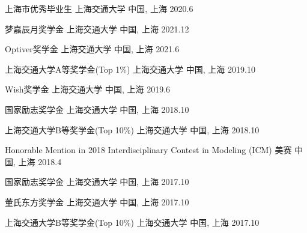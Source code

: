 


\begin{cvhonors}


\cvhonor
{上海市优秀毕业生} %
{上海交通大学} %
{中国, 上海} %
{2020.6} %


\cvhonor
{梦嘉辰月奖学金} %
{上海交通大学} %
{中国, 上海} %
{2021.12} %


\cvhonor
{Optiver奖学金} %
{上海交通大学} %
{中国, 上海} %
{2021.6} %


\cvhonor
{上海交通大学A等奖学金(Top 1\%)} %
{上海交通大学} %
{中国, 上海} %
{2019.10} %


\cvhonor
{Wish奖学金} %
{上海交通大学} %
{中国, 上海} %
{2019.6} %


\cvhonor
{国家励志奖学金} %
{上海交通大学} %
{中国, 上海} %
{2018.10} %


\cvhonor
{上海交通大学B等奖学金(Top 10\%)} %
{上海交通大学} %
{中国, 上海} %
{2018.10} %


\cvhonor
{Honorable Mention in 2018 Interdisciplinary Contest in Modeling (ICM)} %
{美赛} %
{中国, 上海} %
{2018.4} %


\cvhonor
{国家励志奖学金} %
{上海交通大学} %
{中国, 上海} %
{2017.10} %


\cvhonor
{董氏东方奖学金} %
{上海交通大学} %
{中国, 上海} %
{2017.10} %


\cvhonor
{上海交通大学B等奖学金(Top 10\%)} %
{上海交通大学} %
{中国, 上海} %
{2017.10} %


\end{cvhonors}

